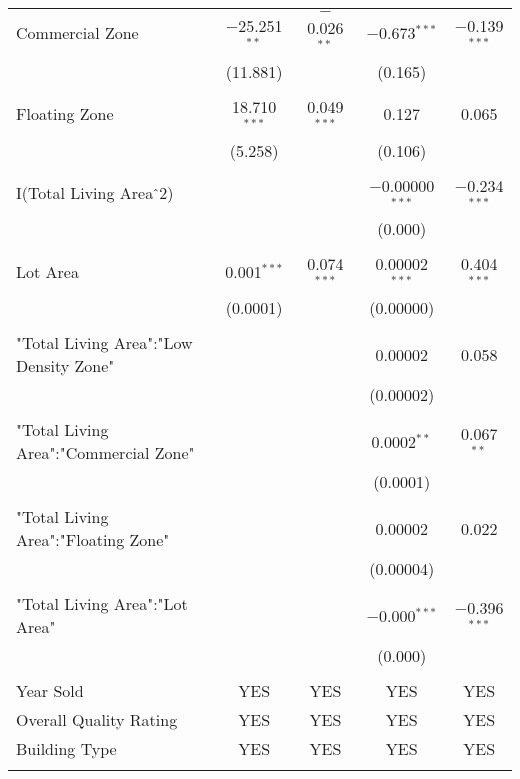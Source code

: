 \documentclass[a4paper]{article}
\begin{document}
\begin{table}[!htbp]
\begin{adjustwidth}{-0.0cm}{-0cm}
\begin{threeparttable}
\begin{tabular}{@{\extracolsep{-1pt}}lcccc}
 Commercial Zone & $-$25.251$^{**}$ & $-$0.026$^{**}$ & $-$0.673$^{***}$ & $-$0.139$^{***}$ \\ 
  & (11.881) &  & (0.165) &  \\ 
  & & & & \\ 
 Floating Zone & 18.710$^{***}$ & 0.049$^{***}$ & 0.127 & 0.065 \\ 
  & (5.258) &  & (0.106) &  \\ 
  & & & & \\ 
 I(Total Living Area$\hat{\mkern6mu}$2) &  &  & $-$0.00000$^{***}$ & $-$0.234$^{***}$ \\ 
  &  &  & (0.000) &  \\ 
  & & & & \\ 
 Lot Area & 0.001$^{***}$ & 0.074$^{***}$ & 0.00002$^{***}$ & 0.404$^{***}$ \\ 
  & (0.0001) &  & (0.00000) &  \\ 
  & & & & \\ 
 "Total Living Area":"Low Density Zone" &  &  & 0.00002 & 0.058 \\ 
  &  &  & (0.00002) &  \\ 
  & & & & \\ 
 "Total Living Area":"Commercial Zone" &  &  & 0.0002$^{**}$ & 0.067$^{**}$ \\ 
  &  &  & (0.0001) &  \\ 
  & & & & \\ 
 "Total Living Area":"Floating Zone" &  &  & 0.00002 & 0.022 \\ 
  &  &  & (0.00004) &  \\ 
  & & & & \\ 
 "Total Living Area":"Lot Area" &  &  & $-$0.000$^{***}$ & $-$0.396$^{***}$ \\ 
  &  &  & (0.000) &  \\ 
  & & & & \\ 
  Year Sold & YES & YES & YES & YES \\ 
  Overall Quality Rating & YES & YES & YES & YES \\  
  Building Type & YES & YES & YES & YES \\ 
\hline \\[-1.8ex] 

\end{tabular}
\end{threeparttable}
\end{adjustwidth}
\end{table}
\end{document}
